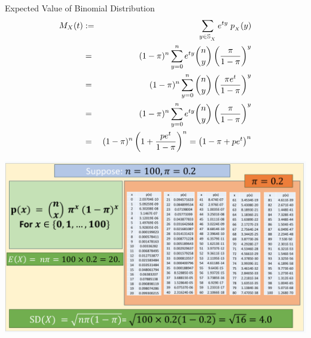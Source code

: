 \documentclass[compress]{beamer}
\begin{document}
\begin{frame}{Expected Value of Binomial Distribution}
\begin{eqnarray}
M_X(t)& := &  \sum_{y\in \support[X]} e^{ty}\; \pmf_{_X}(y) \nonumber\\
& =& (1-\binP)^{n}  \sum_{y=0}^{n}  e^{ty} {n\choose y}\left( \frac{\binP}{1-\binP}\right)^y   \nonumber\\
& =& (1-\binP)^{n}  \sum_{y=0}^{n}  {n\choose y}\left( \frac{\binP e^{t}}{1-\binP}\right)^y   \nonumber\\
& =& (1-\binP)^{n}  \sum_{y=0}^{n}  e^{ty} {n\choose y}\left( \frac{\binP}{1-\binP}\right)^y   \nonumber\\
& =& (1-\binP)^{n} \left( 1+  \frac{pe^t}{1-\binP} \right)^n = \left( 1-\binP+pe^t\right)^n  \nonumber\\
\end{eqnarray}



\end{frame}


\begin{frame}
\vspace{-.1in}
\begin{center}
\includegraphics[scale=.45]{figs/BinomialExpectedValue.png}
\end{center}
\vspace{1in}
\end{frame}
\end{document}
